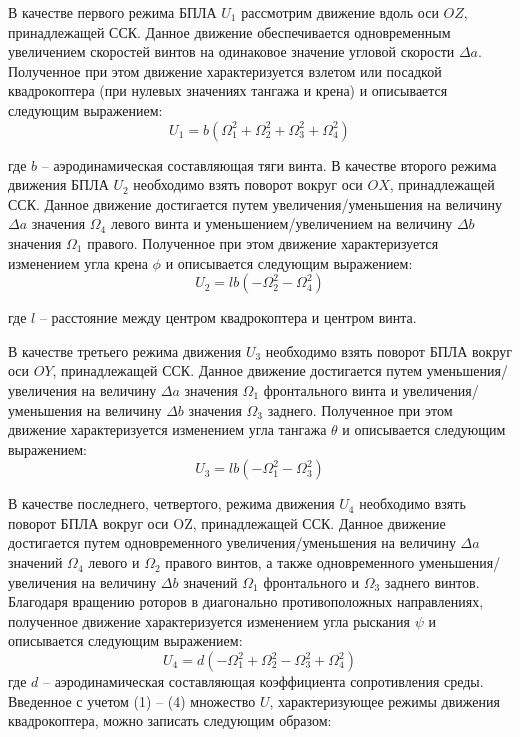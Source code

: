 В качестве первого режима БПЛА \(U_{1}\) рассмотрим движение вдоль оси \(OZ\), принадлежащей ССК. Данное движение обеспечивается одновременным увеличением скоростей винтов на одинаковое значение угловой скорости \(\Delta a\). Полученное при этом движение характеризуется взлетом или посадкой квадрокоптера (при нулевых значениях тангажа и крена) и описывается следующим выражением:
\begin{equation}
U_{1}=b(\Omega_{1}^2+\Omega_{2}^2+\Omega_{3}^2+\Omega_{4}^2)
\end{equation}

где \(b\) -- аэродинамическая составляющая тяги винта.
В качестве второго режима движения БПЛА \(U_{2}\) необходимо взять поворот вокруг оси \(OX\), принадлежащей ССК. Данное движение достигается путем увеличения/уменьшения на величину \(\Delta a\) значения \(\Omega_{4}\) левого винта и уменьшением/увеличением на величину \(\Delta b\) значения \(\Omega_{1}\)
правого. Полученное при этом движение характеризуется изменением угла крена \(\phi\) и описывается следующим выражением:
\begin{equation}
U_{2}=lb(-\Omega_{2}^2-\Omega_{4}^2)
\end{equation}

где \(l\) -- расстояние между центром квадрокоптера и центром винта.

В качестве третьего режима движения \(U_{3}\) необходимо взять поворот БПЛА вокруг оси \(OY\), принадлежащей ССК. Данное движение достигается путем уменьшения/увеличения на величину \(\Delta a\) значения \(\Omega_{1}\) фронтального винта и увеличения/уменьшения на величину \(\Delta b\) значения \(\Omega_{3}\) заднего. Полученное при этом движение характеризуется изменением угла тангажа \(\theta\) и описывается следующим выражением:
\begin{equation}
U_{3}=lb(-\Omega_{1}^2-\Omega_{3}^2)
\end{equation}

В качестве последнего, четвертого, режима движения \(U_{4}\) необходимо взять поворот БПЛА вокруг оси OZ, принадлежащей ССК. Данное движение достигается путем одновременного увеличения/уменьшения на величину \(\Delta a\) значений \(\Omega_{4}\) левого и \(\Omega_{2}\) правого винтов, а также одновременного уменьшения/увеличения на величину \(\Delta b\) значений \(\Omega_{1}\) фронтального и \(\Omega_{3}\) заднего винтов. Благодаря вращению роторов в диагонально противоположных направлениях, полученное движение характеризуется изменением угла рыскания \(\psi\) и описывается следующим выражением:
\begin{equation}
U_{4}=d(-\Omega_{1}^2+\Omega_{2}^2-\Omega_{3}^2+\Omega_{4}^2)
\end{equation}
где \(d\) -- аэродинамическая составляющая коэффициента сопротивления среды.
Введенное с учетом (1) -- (4) множество \(U\), характеризующее режимы
движения квадрокоптера, можно записать следующим образом:


